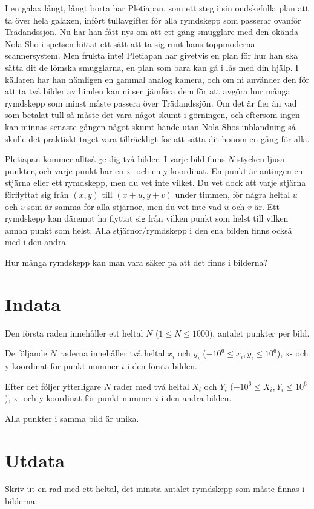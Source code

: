I en galax långt, långt borta har Pletiapan, som ett steg i sin ondskefulla plan att ta över hela galaxen, infört tullavgifter för alla rymdskepp som passerar ovanför Trädandssjön.
Nu har han fått nys om att ett gäng smugglare med den ökända Nola Sho i spetsen hittat ett sätt att ta sig runt hans toppmoderna scannersystem.
Men frukta inte! Pletiapan har givetvis en plan för hur han ska sätta dit de lömska smugglarna, en plan som bara kan gå i lås med din hjälp.
I källaren har han nämligen en gammal analog kamera, och om ni använder den för att ta två bilder av himlen kan ni sen jämföra dem för att avgöra hur många rymdskepp som minst måste passera över Trädandssjön.
Om det är fler än vad som betalat tull så måste det vara något skumt i görningen, och eftersom ingen kan minnas senaste gången något skumt hände utan Nola Shos inblandning så skulle det praktiskt taget vara tillräckligt för att sätta dit honom en gång för alla.

Pletiapan kommer alltså ge dig två bilder. I varje bild finns $N$ stycken ljusa punkter, och varje punkt har en x- och en y-koordinat.
En punkt är antingen en stjärna eller ett rymdskepp, men du vet inte vilket.
Du vet dock att varje stjärna förflyttat sig från $(x, y)$ till $(x + u, y + v)$ under timmen, för några heltal $u$ och $v$ som är samma för alla stjärnor, men du vet inte vad $u$ och $v$ är.
Ett rymdskepp kan däremot ha flyttat sig från vilken punkt som helst till vilken annan punkt
som helst. Alla stjärnor/rymdskepp i den ena bilden finns också med i den andra.

Hur många rymdskepp kan man vara säker på att det finns i bilderna?

\section*{Indata}
Den första raden innehåller ett heltal $N$ ($1 \leq N \leq 1000$), antalet punkter per bild.

De följande $N$ raderna innehåller två heltal $x_i$ och $y_i$ ($-10^6 \leq x_i, y_i \leq 10^6$),
x- och y-koordinat för punkt nummer $i$ i den första bilden.

Efter det följer ytterligare $N$ rader med två heltal $X_i$ och $Y_i$ ($-10^6 \leq X_i, Y_i \leq 10^6$),
x- och y-koordinat för punkt nummer $i$ i den andra bilden.

Alla punkter i samma bild är unika.

\section*{Utdata}
Skriv ut en rad med ett heltal, det minsta antalet rymdskepp som måste finnas i bilderna.


